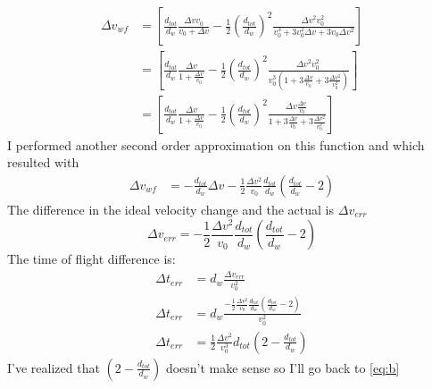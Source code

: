 \documentclass[12pt,letterpaper]{letter}
\newcommand{\dv}{\Delta v}
\begin{document}
\begin{align}
   \label{eq:b}
   \dv_{wf} &= \left[ \frac{d_{tot}}{d_w}\frac{\dv v_0 }{v_0 +\dv} -\frac{1}{2}\left( \frac{d_{tot}}{d_w}\right)^2\frac{\dv^2 v_0^2\ }{v_0^3+3v_0^2 \dv +3v_0\dv^2} \right]\\
   &= \left[ \frac{d_{tot}}{d_w}\frac{\dv}{1+\frac{\dv}{v_0}} -\frac{1}{2}\left( \frac{d_{tot}}{d_w}\right)^2\frac{\dv^2 v_0^2\ }{v_0^3\left(1+3\frac{ \dv}{v_0} +3\frac{\dv^2}{v_0^2}\right)} \right]\\
   &= \left[ \frac{d_{tot}}{d_w}\frac{\dv}{1+\frac{\dv}{v_0}} -\frac{1}{2}\left( \frac{d_{tot}}{d_w}\right)^2\frac{\dv \frac{\dv} {v_0}\ }{1+3\frac{ \dv}{v_0} +3\frac{\dv^2}{v_0^2}} \right]
\end{align}
I performed another second order approximation on this function and which resulted with
\begin{align}
   \dv_{wf} &= - \frac{d_{tot}}{d_w}\dv - \frac{1}{2} \frac{\dv^2}{v_0}\frac{d_{tot}}{d_w}\left( \frac{d_{tot}}{d_w}-2 \right)
\end{align}
The difference in the ideal velocity change and the actual is $\dv_{err}$
\begin{equation}
   \dv_{err} =  - \frac{1}{2} \frac{\dv^2}{v_0}\frac{d_{tot}}{d_w}\left( \frac{d_{tot}}{d_w}-2 \right)
   \label{dverr}
\end{equation}
The time of flight difference is:
\begin{align}
   \Delta t_{err} &= d_w \frac{\dv_{err}}{v_0^2} \\
   \Delta t_{err} &= d_w \frac{ - \frac{1}{2} \frac{\dv^2}{v_0}\frac{d_{tot}}{d_w}\left( \frac{d_{tot}}{d_w}-2 \right)}{v_0^2} \\
   \Delta t_{err} &= \frac{1}{2} \frac{\dv^2}{v_0^3} d_{tot} \left(2 -  \frac{d_{tot}}{d_w} \right)
\end{align}
I've realized that $\left(2 -  \frac{d_{tot}}{d_w} \right)$ doesn't make sense so I'll go back to \eqref{eq:b}
\end{document}
